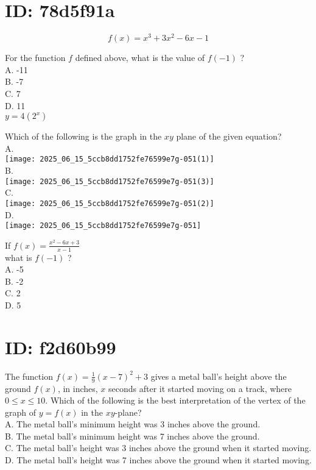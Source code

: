 \section*{ID: 78d5f91a}
$$
f(x)=x^{3}+3 x^{2}-6 x-1
$$

For the function $f$ defined above, what is the value of $f(-1)$ ?\\
A. -11\\
B. -7\\
C. 7\\
D. 11\\
$y=4\left(2^{x}\right)$

Which of the following is the graph in the $x y$ plane of the given equation?\\
A.\\
\texttt{[image: 2025\_06\_15\_5ccb8dd1752fe76599e7g-051(1)]}\\
B.\\
\texttt{[image: 2025\_06\_15\_5ccb8dd1752fe76599e7g-051(3)]}\\
C.\\
\texttt{[image: 2025\_06\_15\_5ccb8dd1752fe76599e7g-051(2)]}\\
D.\\
\texttt{[image: 2025\_06\_15\_5ccb8dd1752fe76599e7g-051]}

If $f(x)=\frac{x^{2}-6 x+3}{x-1}$\\
what is $f(-1)$ ?\\
A. -5\\
B. -2\\
C. 2\\
D. 5

\section*{ID: f2d60b99}
The function $f(x)=\frac{1}{9}(x-7)^{2}+3$ gives a metal ball's height above the ground $f(x)$, in inches, $x$ seconds after it started moving on a track, where $0 \leq x \leq 10$. Which of the following is the best interpretation of the vertex of the graph of $y=f(x)$ in the $x y$-plane?\\
A. The metal ball's minimum height was 3 inches above the ground.\\
B. The metal ball's minimum height was 7 inches above the ground.\\
C. The metal ball's height was 3 inches above the ground when it started moving.\\
D. The metal ball's height was 7 inches above the ground when it started moving.

